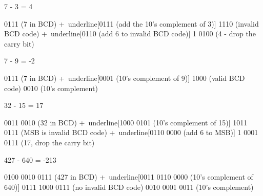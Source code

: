 \begin{minipage}{\linewidth} %
\begin{binDisp}[commandchars=~\[\]]

    7 - 3 = 4

          0111  (7 in BCD)
         +~underline[0111  (add the 10's complement of 3)]
          1110  (invalid BCD code)
         +~underline[0110  (add 6 to invalid BCD code)]
        1 0100  (4 - drop the carry bit)

\end{binDisp}
\end{minipage}

\begin{minipage}{\linewidth} %
\begin{binDisp}[commandchars=~\[\]]

    7 - 9 = -2

          0111  (7 in BCD)
         +~underline[0001  (10's complement of 9)]
          1000  (valid BCD code)
          0010  (10's complement)

\end{binDisp}
\end{minipage}

\begin{minipage}{\linewidth} %
\begin{binDisp}[commandchars=~\[\]]

    32 - 15 = 17

          0011 0010  (32 in BCD)
         +~underline[1000 0101  (10's complement of 15)]
          1011 0111  (MSB is invalid BCD code)
         +~underline[0110 0000  (add 6 to MSB)]
        1 0001 0111  (17, drop the carry bit)

\end{binDisp}
\end{minipage}

\begin{minipage}{\linewidth} %
\begin{binDisp}[commandchars=~\[\]]

    427 - 640 = -213

          0100 0010 0111  (427 in BCD)
         +~underline[0011 0110 0000  (10's complement of 640)]
          0111 1000 0111  (no invalid BCD code)
          0010 0001 0011  (10's complement)

\end{binDisp}
\end{minipage}

